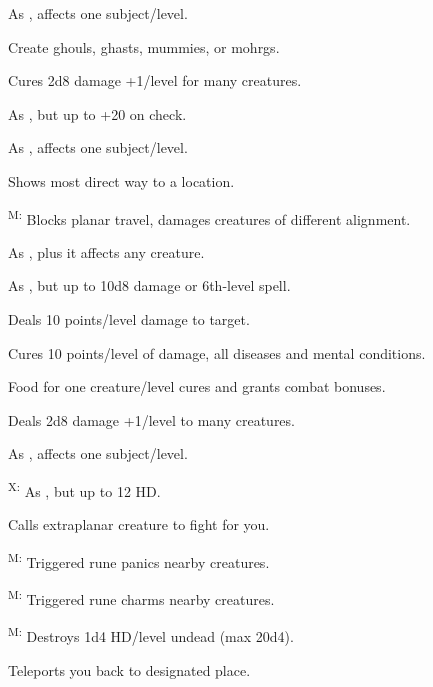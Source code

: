  As , affects one subject/level.

 Create ghouls, ghasts, mummies, or mohrgs.

 Cures 2d8 damage +1/level for many creatures.

 As , but up to +20 on check.

 As , affects one subject/level.

 Shows most direct way to a location.

\textsuperscript{M:} Blocks planar travel, damages creatures of different alignment.

 As , plus it affects any creature.

 As , but up to 10d8 damage or 6th-level spell.

 Deals 10 points/level damage to target.

 Cures 10 points/level of damage, all diseases and mental conditions.

 Food for one creature/level cures and grants combat bonuses.

 Deals 2d8 damage +1/level to many creatures.

 As , affects one subject/level.

\textsuperscript{X:} As , but up to 12 HD.

 Calls extraplanar creature to fight for you.

\textsuperscript{M:} Triggered rune panics nearby creatures.

\textsuperscript{M:} Triggered rune charms nearby creatures.

\textsuperscript{M:} Destroys 1d4 HD/level undead (max 20d4).


 Teleports you back to designated place.



